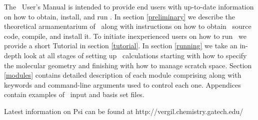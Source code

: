 The \PSIthree\ User's Manual is intended to provide end users with
up-to-date information on how to obtain, install, and run \PSIthree .
In section \ref{preliminary} we describe the theoretical
armamentarium of \PSIthree\ along with instructions on how to
obtain \PSIthree\ source code, compile, and install it.
To initiate inexperienced users on how to run \PSIthree\
we provide a short Tutorial in section \ref{tutorial}.
In section \ref{running} we take an in-depth look at all stages of
setting up \PSIthree\ calculations starting with how to specify the molecular
geometry and finishing with how to manage scratch space.
Section \ref{modules} contains detailed description of each module
comprising \PSIthree along with keywords and command-line
arguments used to control each one.
Appendices contain examples of \PSIthree\ input and basis set files.

Latest information on Psi can be found at
{http://vergil.chemistry.gatech.edu/}

